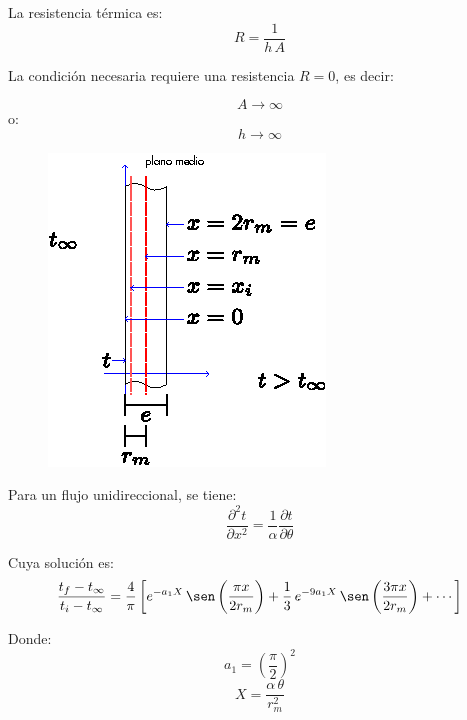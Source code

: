 La resistencia térmica es:
\begin{equation*}
    R = \frac{1}{h\,A}
\end{equation*}

La condición necesaria requiere una resistencia $R=0$, es decir:

\begin{equation*}
    A\rightarrow\infty
\end{equation*}
o:
\begin{equation*}
    h\rightarrow\infty
\end{equation*}

\begin{figure}[!h]
\centering
\includegraphics[scale=1.75]{figura03_06.eps}
\end{figure}

Para un flujo unidireccional, se tiene:
\begin{equation*}
    \frac{\partial^2 t}{\partial x^2} =
    \frac{1}{\alpha}\frac{\partial t}{\partial\theta}
\end{equation*}

Cuya solución es:
\begin{equation}
    \frac{t_f-t_\infty}{t_i-t_\infty} = \frac{4}{\pi}\left[
        e^{-a_1 X}\,\sen\left(\frac{\pi x}{2r_m}\right)+
        \frac{1}{3}\,e^{-9a_1 X}\,\sen\left(\frac{3\pi x}{2r_m}\right)+
        \cdots
    \right]
    \label{analitico_especial}
\end{equation}

Donde:
\begin{equation}
    a_1 = \left(\frac{\pi}{2}\right)^2
\end{equation}
\begin{equation}
    X = \frac{\alpha\,\theta}{r_m^2}
\end{equation}

